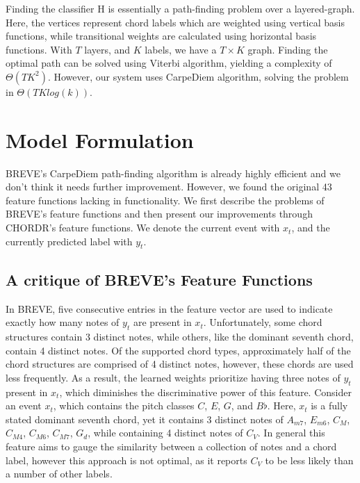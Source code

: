 \documentclass{article} %
\begin{document}
Finding the classifier H is essentially a path-finding problem over a layered-graph. Here, the vertices represent chord labels which are weighted using vertical basis functions, while transitional weights are calculated using horizontal basis functions. With $T$ layers, and $K$ labels, we have a $T \times K$ graph. Finding the optimal path can be solved using Viterbi algorithm, yielding a complexity of $\Theta(TK^2)$. However, our system uses CarpeDiem algorithm, solving the problem in $\Theta(TKlog(k))$.

\section{Model Formulation}

BREVE’s CarpeDiem path-finding algorithm \cite{carpediem} is already highly efficient and we don’t think it needs further improvement. However, we found the original 43 feature functions lacking in functionality. We first describe the problems of BREVE’s feature functions and then present our improvements through CHORDR’s feature functions. We denote the current event with $x_t$, and the currently predicted label with $y_t$.

\subsection{A critique of BREVE's Feature Functions}

In BREVE, five consecutive entries in the feature vector are used to indicate exactly how many notes of $y_t$ are present in $x_t$. Unfortunately, some chord structures contain 3 distinct notes, while others, like the dominant seventh chord, contain 4 distinct notes. Of the supported chord types, approximately half of the chord structures are comprised of 4 distinct notes, however, these chords are used less frequently. As a result, the learned weights prioritize having three notes of $y_t$ present in $x_t$, which diminishes the discriminative power of this feature. Consider an event $x_t$, which contains the pitch classes $C$, $E$, $G$, and $B\flat$. Here, $x_t$ is a fully stated dominant seventh chord, yet it contains 3 distinct notes of $A_{m7}$, $E_{m6}$, $C_{M}$, $C_{M4}$, $C_{M6}$, $C_{M7}$, $G_{d}$, while containing 4 distinct notes of $C_V$. In general this feature aims to gauge the similarity between a collection of notes and a chord label, however this approach is not optimal, as it reports $C_V$ to be less likely than a number of other labels.
\end{document}
